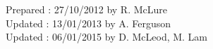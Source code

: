 \documentclass[12pt]{article}
\begin{document}
{\vspace*{2cm}


\noindent
Prepared : 27/10/2012 by R. McLure\\
Updated : 13/01/2013 by A. Ferguson\\
Updated : 06/01/2015 by D. McLeod, M. Lam
}

\newpage


\end{document}

